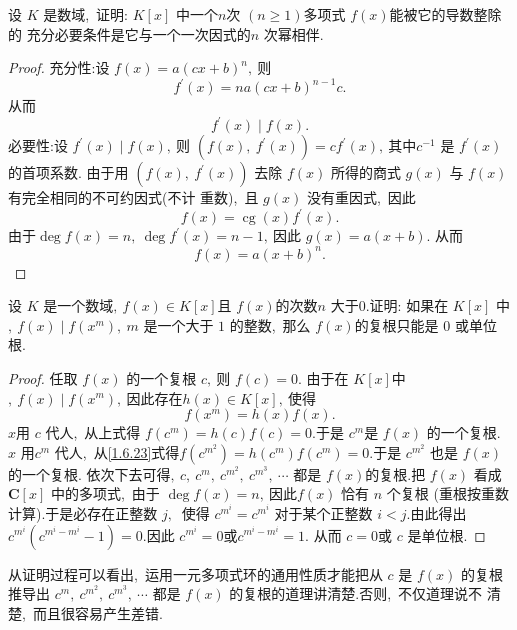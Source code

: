 \newpage
\begin{problem}
	设 $ K $ 是数域,\  证明: $ K[x] $ 中一个$  n  $次 $ (n \geqslant 1)  $多项式  $f(x)  $能被它的导数整除的 充分必要条件是它与一个一次因式的$  n$  次幂相伴.
\end{problem}
\begin{proof}
	充分性:设  $f(x)=a(c x+b)^{n} ,\  $则
	$$f^{\prime}(x)=n a(c x+b)^{n-1} c .$$
	从而
	$$f^{\prime}(x) \mid f(x) .$$
	必要性:设 $ f^{\prime}(x) \mid f(x) ,\  $则 $ \left(f(x),\  f^{\prime}(x)\right)=c f^{\prime}(x) ,\  $其中$  c^{-1}$  是 $ f^{\prime}(x)  $的首项系数. 由于用 $ \left(f(x),\  f^{\prime}(x)\right) $ 去除 $ f(x) $ 所得的商式  $g(x)$  与  $f(x) $ 有完全相同的不可约因式(不计 重数),\  且  $g(x) $ 没有重因式,\  因此
	$$f(x)=\operatorname{cg}(x) f^{\prime}(x) .$$
	由于$  \operatorname{deg} f(x)=n,\  \operatorname{deg} f^{\prime}(x)=n-1 ,\  $因此  $g(x)=a(x+b) .$
	从而
	$$f(x)=a(x+b)^{n} .$$
\end{proof}
\newpage
\begin{problem}
	设 $ K $ 是一个数域$,\   f(x) \in K[x]  $且 $ f(x)  $的次数$  n $ 大于$ 0.$证明: 如果在  $K[x] $ 中$,\   f(x) \mid f\left(x^{m}\right),\  m$  是一个大于 $1$ 的整数,\  那么 $ f(x)  $的复根只能是 $0$ 或单位根.
\end{problem}
\begin{proof}
	任取 $ f(x)$  的一个复根 $ c ,\  $则 $ f(c)=0  .$
	由于在  $K[x]  $中$,\   f(x) \mid f\left(x^{m}\right) ,\  $因此存在$  h(x) \in K[x] ,\  $使得
	\begin{equation}
		f\left(x^{m}\right)=h(x) f(x) .\label{1.6.23}
	\end{equation}
	$x  $用 $ c $ 代人,\  从上式得 $ f\left(c^{m}\right)=h(c) f(c)=0  .$于是 $ c^{m}  $是 $ f(x) $ 的一个复根.\\
	$x $ 用$  c^{m} $ 代人,\  从\eqref{1.6.23}式得$  f\left(c^{m^{2}}\right)=h\left(c^{m}\right) f\left(c^{m}\right)=0  .$于是 $ c^{m^{2}} $ 也是 $ f(x)  $的一个复根. 依次下去可得$,\   c,\  c^{m},\  c^{m^{2}},\  c^{m^{3}},\  \cdots $ 都是 $ f(x)  $的复根.把 $ f(x) $ 看成 $ \mathbf{C}[x] $ 中的多项式,\  由于 $ \operatorname{deg} f(x)=n ,\  $因此$  f(x)$  恰有  $n $ 个复根 (重根按重数计算).于是必存在正整数 $ j ,\ $ 使得 $ c^{m^{i}}=c^{m^{i}}$  对于某个正整数 $ i<j  .$由此得出 $ c^{m^{i}}\left(c^{m^{i}-m^{i}}-1\right)=0  .$因此 $ c^{m^{i}}=0  或  c^{m^{i}-m^{i}}=1  .$ 从而  $c=0  $或 $ c$  是单位根.
\end{proof}
\begin{note}
	从证明过程可以看出,\  运用一元多项式环的通用性质才能把从 $ c $ 是 $ f(x)$  的复根推导出 $ c^{m},\  c^{m^{2}},\  c^{m^{3}},\  \cdots $ 都是 $ f(x) $ 的复根的道理讲清楚.否则,\  不仅道理说不 清楚,\  而且很容易产生差错.
\end{note}
